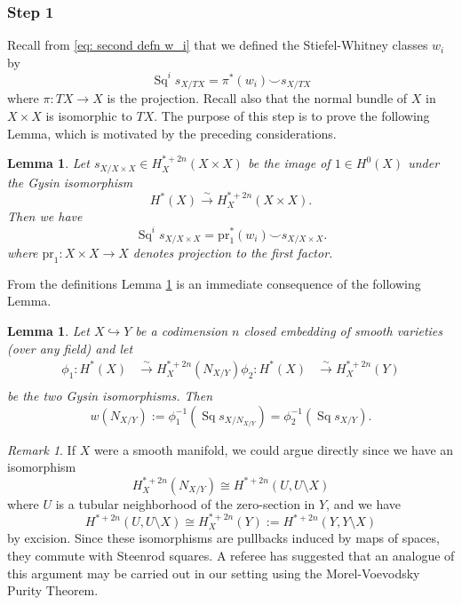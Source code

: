 \documentclass[10pt, reqno]{amsart}
\numberwithin{equation}{subsection}
\newcommand{\mrm}[1]{\mathrm{#1}}
\newcommand{\co}{\colon}
\DeclareMathOperator{\et}{\acute{e}t}
\DeclareMathOperator{\Sq}{Sq}
\newtheorem{lemma}[thm]{Lemma}
\theoremstyle{remark}
\newtheorem{remark}[thm]{Remark}
\begin{document}
\subsubsection{Step 1} Recall from \eqref{eq: second defn w_i} that we defined the Stiefel-Whitney classes $w_i$ by 
\[
\Sq^i s_{X/TX} =  \pi^*(w_i) \smile s_{X/TX}
\]
where $\pi \co TX \rightarrow X$ is the projection. Recall also that the normal bundle of $X$ in $X \times X$ is isomorphic to $TX$. The purpose of this step is to prove the following Lemma, which is motivated by the preceding considerations.

\begin{lemma}\label{lem: step 1}
Let $s_{X/X\times X} \in H_X^{*+2n}(X\times X)$  be the image of $1 \in H^0_{\et}(X)$ under the Gysin isomorphism 
\[
H_{\et}^*(X) \xrightarrow{\sim} H_X^{*+2n}(X\times X).
\]
Then we have 
\begin{equation}\label{WuProof1}
\Sq^i s_{X/X\times X} =  \mrm{pr}_1^*(w_i) \smile s_{X/X\times X}.
\end{equation}
where $\mrm{pr}_1 \co X \times X\rightarrow X$ denotes projection to the first factor.
\end{lemma}

From the definitions Lemma \ref{lem: step 1} is an immediate consequence of the following Lemma. 

\begin{lemma}
Let $X \hookrightarrow Y$ be a codimension $n$ closed embedding of smooth varieties (over any field) and let
\begin{align*}
\phi_1 \colon H^*(X) & \xrightarrow{\sim} H^{*+2n}_X(N_{X/Y})
\phi_2 \colon H^*(X) & \xrightarrow{\sim} H^{*+2n}_X(Y) \\
\end{align*}
be the two Gysin isomorphisms. Then 
 \[
w(N_{X/Y}) := \phi_1^{-1} (\Sq s_{X/N_{X/Y}}) = \phi_2^{-1} (\Sq s_{X/Y}).
\]
\end{lemma}

\begin{remark}\label{rem: excision} If $X$ were a smooth manifold, we could argue directly since we have an isomorphism 
\[
H_X^{*+2n}(N_{X/Y}) \cong H^{*+2n}(U, U \setminus X) 
\]
where $U$ is a tubular neighborhood of the zero-section in $Y$, and we have 
\[
H^{*+2n}(U, U \setminus X)  \cong H^{*+2n}_X(Y) :=  H^{*+2n}(Y, Y \setminus X)
\]
by excision. Since these isomorphisms are pullbacks induced by maps of spaces, they commute with Steenrod squares. A referee has suggested that an analogue of this argument may be carried out in our setting using the Morel-Voevodsky Purity Theorem. 
\end{remark}
\end{document}

